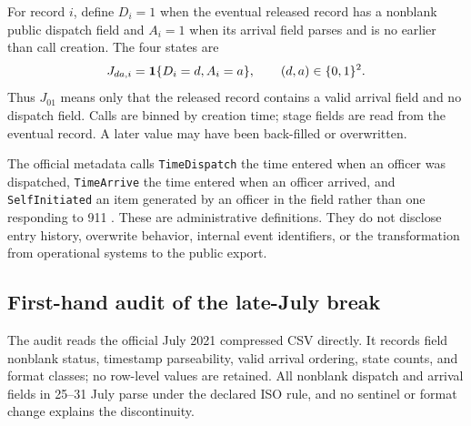 \documentclass[11pt]{article}
\begin{document}
For record $i$, define $D_i=1$ when the eventual released record has a nonblank public dispatch field and $A_i=1$ when its arrival field parses and is no earlier than call creation. The four states are
\begin{equation}
J_{da,i}=\mathbf{1}\{D_i=d,A_i=a\},\qquad (d,a)\in\{0,1\}^2.
\end{equation}
Thus $J_{01}$ means only that the released record contains a valid arrival field and no dispatch field. Calls are binned by creation time; stage fields are read from the eventual record. A later value may have been back-filled or overwritten.

The official metadata calls \texttt{TimeDispatch} the time entered when an officer was dispatched, \texttt{TimeArrive} the time entered when an officer arrived, and \texttt{SelfInitiated} an item generated by an officer in the field rather than one responding to 911 \citep{DataNOLA2021}. These are administrative definitions. They do not disclose entry history, overwrite behavior, internal event identifiers, or the transformation from operational systems to the public export.

\subsection{First-hand audit of the late-July break}

The audit reads the official July 2021 compressed CSV directly. It records field nonblank status, timestamp parseability, valid arrival ordering, state counts, and format classes; no row-level values are retained. All nonblank dispatch and arrival fields in 25--31 July parse under the declared ISO rule, and no sentinel or format change explains the discontinuity.
\end{document}
